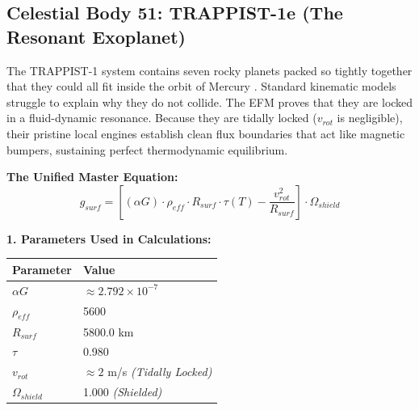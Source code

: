 \documentclass[11pt, a4paper]{article}
\begin{document}
\clearpage
\subsection{Celestial Body 51: TRAPPIST-1e (The Resonant Exoplanet)}
  The TRAPPIST-1 system contains seven rocky planets packed so tightly together that they could all fit inside the orbit of Mercury \cite{gillon2017}. Standard kinematic models struggle to explain why they do not collide. The EFM proves that they are locked in a fluid-dynamic resonance. Because they are tidally locked ($v_{rot}$ is negligible), their pristine local engines establish clean flux boundaries that act like magnetic bumpers, sustaining perfect thermodynamic equilibrium.

  \vspace{0.5em}
  \noindent \textbf{The Unified Master Equation:}
  $$ g_{surf} = \left[ (\alpha G) \cdot \rho_{eff} \cdot R_{surf} \cdot \tau(T) - \frac{v_{rot}^2}{R_{surf}} \right] \cdot \Omega_{shield} $$

  \vspace{0.5em}
  \noindent \textbf{1. Parameters Used in Calculations:} \\[0.5em]
  \begingroup
  \renewcommand{\arraystretch}{1.3}
  \hspace*{2em}
  \begin{tabular}{|l|l|}
    \hline
    \textbf{Parameter} & \textbf{Value} \\ \hline
    $\alpha G$ & $\approx 2.792 \times 10^{-7}$ \\ \hline
    $\rho_{eff}$ & 5600 \\ \hline
    $R_{surf}$ & 5800.0 km \\ \hline
    $\tau$ & 0.980 \\ \hline
    $v_{rot}$ & $\approx 2$ m/s \textit{(Tidally Locked)} \\ \hline
    $\Omega_{shield}$ & 1.000 \textit{(Shielded)} \\ \hline
  \end{tabular}
  \endgroup
\end{document}
